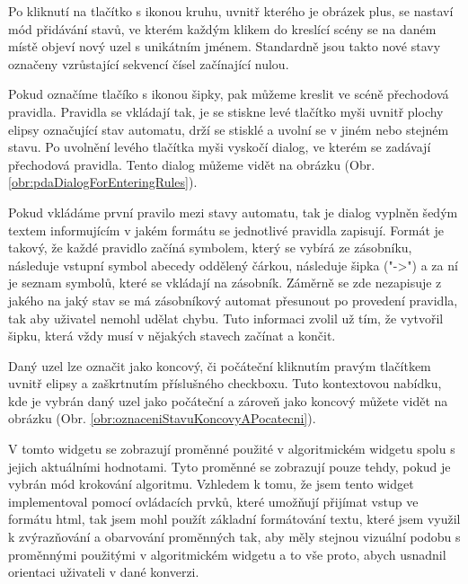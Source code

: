 Po kliknutí na tlačítko s ikonou kruhu, uvnitř kterého je obrázek plus, se nastaví mód přidávání stavů, ve kterém každým klikem do kreslící scény se na daném místě objeví nový uzel s unikátním jménem. Standardně jsou takto nové stavy označeny vzrůstající sekvencí čísel začínající nulou.

Pokud označíme tlačíko s ikonou šipky, pak můžeme kreslit ve scéně přechodová pravidla. Pravidla se vkládají tak, je se stiskne levé tlačítko myši uvnitř plochy elipsy označující stav automatu, drží se stisklé a uvolní se v jiném nebo stejném stavu. Po uvolnění levého tlačítka myši vyskočí dialog, ve kterém se zadávají přechodová pravidla. Tento dialog můžeme vidět na obrázku (Obr. \ref{obr:pdaDialogForEnteringRules}). 


Pokud vkládáme první pravilo mezi stavy automatu, tak je dialog vyplněn šedým textem informujícím v jakém formátu se jednotlivé pravidla zapisují.
Formát je takový, že každé pravidlo začíná symbolem, který se vybírá ze zásobníku, následuje vstupní symbol abecedy oddělený čárkou, následuje šipka ("->") a za ní je seznam symbolů, které se vkládají na zásobník. Záměrně se zde nezapisuje z jakého na jaký stav se má zásobníkový automat přesunout po provedení pravidla, tak aby uživatel nemohl udělat chybu. Tuto informaci zvolil už tím, že vytvořil šipku, která vždy musí v nějakých stavech začínat a končit.

Daný uzel lze označit jako koncový, či počáteční kliknutím pravým tlačítkem uvnitř elipsy a zaškrtnutím příslušného checkboxu. Tuto kontextovou nabídku, kde je vybrán daný uzel jako počáteční a zároveň jako koncový můžete vidět na obrázku (Obr. \ref{obr:oznaceniStavuKoncovyAPocatecni}).



V tomto widgetu se zobrazují proměnné použité v algoritmickém widgetu spolu s jejich  aktuálními hodnotami. Tyto proměnné se zobrazují pouze tehdy, pokud je vybrán mód krokování algoritmu. Vzhledem k tomu, že jsem tento widget implementoval pomocí ovládacích prvků, které umožňují přijímat vstup ve formátu html, tak jsem mohl použít základní formátování textu, které jsem využil k zvýrazňování a obarvování proměnných tak, aby měly stejnou vizuální podobu s proměnnými použitými v algoritmickém widgetu a to vše proto, abych usnadnil orientaci uživateli v dané konverzi.

